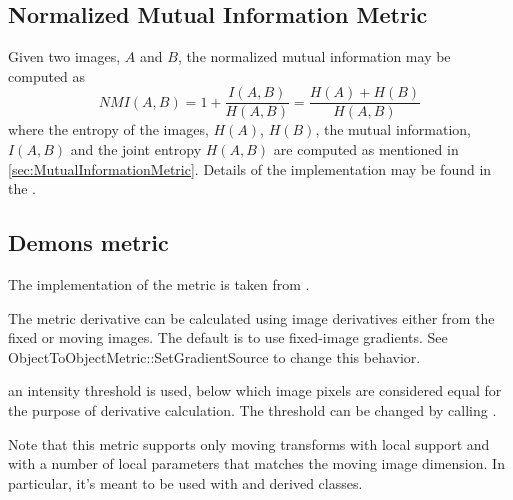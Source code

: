 \subsection{Normalized Mutual Information Metric}
Given two images, $A$ and $B$, the normalized mutual information may be computed as
\begin{equation}
NMI(A,B) = 1 + \frac{I(A,B)}{H(A,B)} = \frac{H(A) + H(B)}{H(A,B)}
\end{equation}
where the entropy of the images, $H(A)$, $H(B)$, the mutual
information, $I(A,B)$ and the joint entropy $H(A,B)$ are computed as mentioned
in \ref{sec:MutualInformationMetric}. Details of the implementation may be found in
the \cite{Hajnal2001}.

\subsection{Demons metric}

The implementation of the  metric is taken from
.

The metric derivative can be calculated using image derivatives
either from the fixed or moving images. The default is to use fixed-image
gradients. See ObjectToObjectMetric::SetGradientSource to change
this behavior.

an intensity threshold is used, below which image pixels are considered
equal for the purpose of derivative calculation. The threshold can be
changed by calling .

Note that this metric supports only moving transforms with local support and
with a number of local parameters that matches the moving image dimension.
In particular, it's meant to be used with 
and derived classes.


